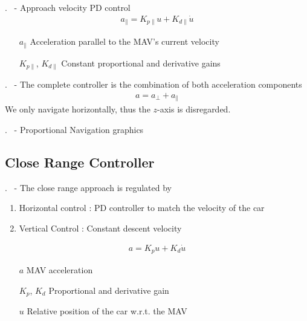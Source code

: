 
\begin{frame}{\thesection. \insertsection \ - \insertsubsection}
	Approach velocity PD control
	\begin{align}
		a_\parallel = K_{p\parallel} u + K_{d\parallel} \dot{u} 
	\end{align}
	\begin{enumerate}
		\item[$a_\parallel$] Acceleration parallel to the MAV's current velocity
		\item[$K_{p\parallel}$, $K_{d\parallel}$] Constant proportional and derivative gains
	\end{enumerate}
\end{frame}


\begin{frame}{\thesection. \insertsection \ - \insertsubsection}
	The complete controller is the combination of both acceleration components
	\begin{align}
		a = a_\perp + a_\parallel
	\end{align}
	We only navigate horizontally, thus the $z$-axis is disregarded.
\end{frame}


\begin{frame}{\thesection. \insertsection \ - \insertsubsection}
	Proportional Navigation graphics
\end{frame}


\subsection{Close Range Controller}
\begin{frame}{\thesection. \insertsection \ - \insertsubsection}
	The close range approach is regulated by
	\begin{enumerate}
		\item Horizontal control : PD controller to match the velocity of the car
		\item Vertical Control : Constant descent velocity
	\end{enumerate}

	\begin{align}
		a = K_p u + K_d \dot{u}
	\end{align}
	\begin{enumerate}
		\item[$a$] MAV acceleration
		\item[$K_p$, $K_d$] Proportional and derivative gain
		\item[$u$] Relative position of the car w.r.t. the MAV 
	\end{enumerate}
\end{frame}

